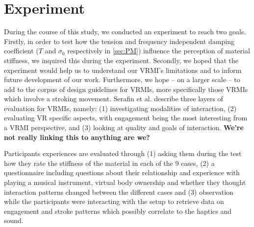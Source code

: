 \documentclass{vgtc}
\begin{document}
\section{Experiment}\label{sec:exp}
During the course of this study, we conducted an experiment to reach two goals. Firstly, in order to test how the tension and frequency independent damping coefficient ($T$ and $\sigma_0$ respectively in \autoref{sec:PM}) influence the perception of material stiffness, we inquired this during the experiment.
Secondly, we hoped that the experiment would help us to understand our VRMI's limitations and to inform future development of our work. %
Furthermore, we hope -- on a larger scale -- to add to the corpus of design guidelines for VRMIs, more specifically those VRMIs which involve a stroking movement. Serafin et al. \cite{Serafin:2016} describe three layers of evaluation for VRMIs, namely: (1) investigating modalities of interaction, (2) evaluating VR specific aspects, with engagement being the most interesting from a VRMI perspective, and (3) looking at quality and goals of interaction. \textbf{\textleftarrow We're not really linking this to anything are we?}

Participants experiences are evaluated through (1) asking them during the test how they rate the stiffness of the material in each of the 9 cases, (2) a questionnaire including questions about their relationship and experience with playing a musical instrument, virtual body ownership and whether they thought interaction patterns changed between the different cases and (3) observation while the participants were interacting with the setup to retrieve data on engagement and stroke patterns which possibly correlate to the haptics and sound.
\end{document}
